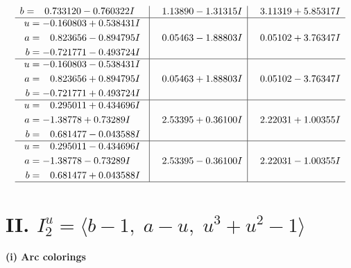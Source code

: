 \documentclass[1p]{elsarticle_modified}
\theoremstyle{definition}
\begin{document}
$$\begin{array}{c|c|c}
\begin{aligned}
b &= \phantom{-}0.733120 - 0.760322 I\end{aligned}
 & \phantom{-}1.13890 - 1.31315 I & \phantom{-}3.11319 + 5.85317 I \\ \hline\begin{aligned}
u &= -0.160803 + 0.538431 I \\
a &= \phantom{-}0.823656 - 0.894795 I \\
b &= -0.721771 - 0.493724 I\end{aligned}
 & \phantom{-}0.05463 - 1.88803 I & \phantom{-}0.05102 + 3.76347 I \\ \hline\begin{aligned}
u &= -0.160803 - 0.538431 I \\
a &= \phantom{-}0.823656 + 0.894795 I \\
b &= -0.721771 + 0.493724 I\end{aligned}
 & \phantom{-}0.05463 + 1.88803 I & \phantom{-}0.05102 - 3.76347 I \\ \hline\begin{aligned}
u &= \phantom{-}0.295011 + 0.434696 I \\
a &= -1.38778 + 0.73289 I \\
b &= \phantom{-}0.681477 - 0.043588 I\end{aligned}
 & \phantom{-}2.53395 + 0.36100 I & \phantom{-}2.22031 + 1.00355 I \\ \hline\begin{aligned}
u &= \phantom{-}0.295011 - 0.434696 I \\
a &= -1.38778 - 0.73289 I \\
b &= \phantom{-}0.681477 + 0.043588 I\end{aligned}
 & \phantom{-}2.53395 - 0.36100 I & \phantom{-}2.22031 - 1.00355 I\\
 \hline 
 \end{array}$$\newpage\newpage\renewcommand{\arraystretch}{1}
\centering \section*{II. $I^u_{2}= \langle b-1,\;a- u,\;u^3+u^2-1 \rangle$}
\flushleft \textbf{(i) Arc colorings}\\
\end{document}

